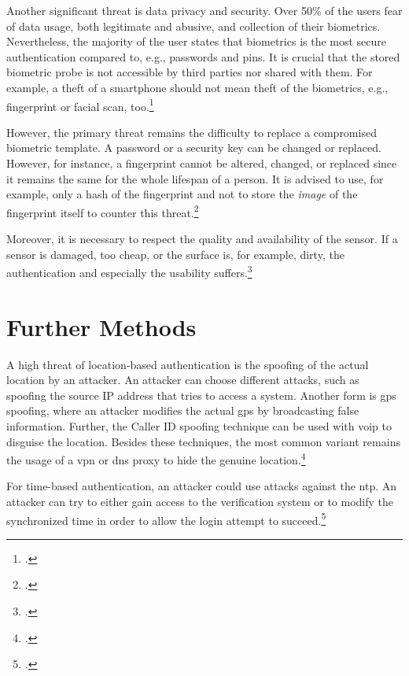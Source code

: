 Another significant threat is data privacy and security. Over 50\% of the users fear of data usage, both legitimate and abusive, and collection of their biometrics. Nevertheless, the majority of the user states that biometrics is the most secure authentication compared to, e.g., passwords and \glspl{pin}. It is crucial that the stored biometric probe is not accessible by third parties nor shared with them. For example, a theft of a smartphone should not mean theft of the biometrics, e.g., fingerprint or facial scan, too.\footcites[See][8]{ibm-security}

However, the primary threat remains the difficulty to replace a compromised biometric template. A password or a security key can be changed or replaced. However, for instance, a fingerprint cannot be altered, changed, or replaced since it remains the same for the whole lifespan of a person. It is advised to use, for example, only a hash of the fingerprint and not to store the \textit{image} of the fingerprint itself to counter this threat.\footcites[See][266]{shostack2014threat}

Moreover, it is necessary to respect the quality and availability of the sensor. If a sensor is damaged, too cheap, or the surface is, for example, dirty, the authentication and especially the usability suffers.\footcites[See][37]{265831}

\section{Further Methods}

A high threat of location-based authentication is the spoofing of the actual location by an attacker. An attacker can choose different attacks, such as spoofing the source IP address that tries to access a system. Another form is \gls{gps} spoofing, where an attacker modifies the actual \gls{gps} by broadcasting false information. Further, the Caller ID spoofing technique can be used with \gls{voip} to disguise the location. Besides these techniques, the most common variant remains the usage of a \gls{vpn} or \gls{dns} proxy to hide the genuine location.\footcites[See][138--145]{517355}[See][Chapter 4.5.3]{30270}[See][115--116,133]{eckert-it-sec-9}

For time-based authentication, an attacker could use attacks against the \gls{ntp}. An attacker can try to either gain access to the verification system or to modify the synchronized time in order to allow the login attempt to succeed.\footcite[See][]{malhotraattacking}
